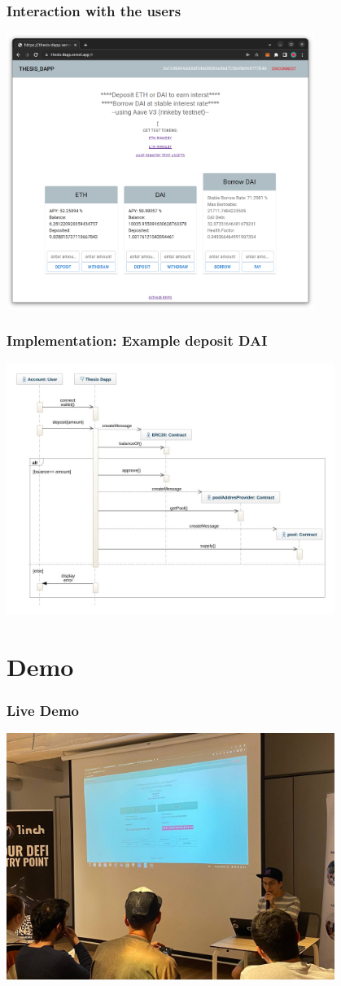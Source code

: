 \documentclass{beamer}
\begin{document}
\begin{frame}
	\frametitle{Interaction with the users}
	\includegraphics[width=0.75\textwidth, center]{../images/thesis-dapp1}
\end{frame}

\begin{frame}
	\frametitle{Implementation: Example deposit DAI}
	\includegraphics[width=0.8\textwidth, center]{../images/sequence-deposit}
\end{frame}

\section{Demo}

\begin{frame}
\frametitle{Live Demo}
\includegraphics[width=0.8\textwidth, center]{demo}
\end{frame}
\end{document}
